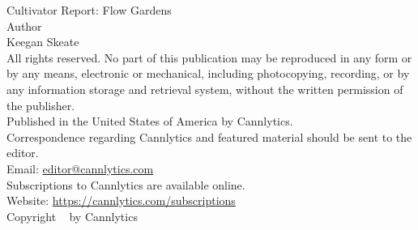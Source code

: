 \documentclass[../article.tex, 11pt]{subfiles}
\begin{document}
{\parindent0pt
{\Large Cultivator Report: Flow Gardens}\\[2\baselineskip]
{\Large Author \\[.5\baselineskip]}
\large Keegan Skeate \\[2.\baselineskip]

All rights reserved. No part of this publication may be reproduced in any form or by any means, electronic or mechanical, including photocopying, recording, or by any information storage and retrieval system, without the written permission of the publisher.\\[.25\baselineskip]

Published in the United States of America by Cannlytics.\\[.25\baselineskip]

Correspondence regarding Cannlytics and featured material should be sent to the editor.\\[.2\baselineskip] Email: \href{mailto:editor@cannlytics.com}{editor@cannlytics.com} \\[.25\baselineskip]

Subscriptions to Cannlytics are available online.\\[.2\baselineskip] Website: \href{https://cannlytics.com/subscriptions}{https://cannlytics.com/subscriptions}\\[.25\baselineskip]

\vspace*{2\baselineskip}
\vfill
{\normalsize Copyright \textcopyright ~\the\year{} by Cannlytics\\[\baselineskip]}

}
\end{document}
